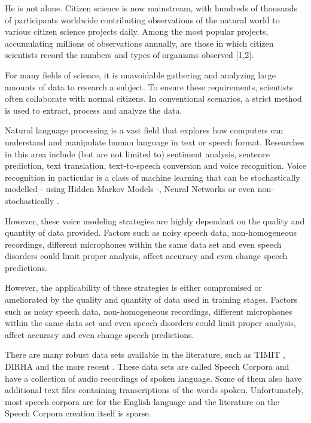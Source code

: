 He is not alone. Citizen science is now mainstream, with hundreds of thousands of participants worldwide contributing observations of the natural world to various citizen science projects daily. Among the most popular projects, accumulating millions of observations annually, are those in which citizen scientists record the numbers and types of organisms observed [1,2].

For many fields of science, it is unavoidable gathering and analyzing large amounts of data to research a subject. To ensure these requirements, scientists often collaborate with normal citizens. 
In conventional scenarios, a strict method is used to extract, process and analyze the data.

Natural language processing is a vast field that explores how computers can understand and manipulate human language in text or speech format. Researches in this area include (but are not limited to) sentiment analysis, sentence prediction, text translation, text-to-speech conversion and voice recognition. Voice recognition in particular is a class of machine learning that can be stochastically modelled - using Hidden Markov Models \cite{gales2008application} -, Neural Networks \cite{graves2013speech} or even non-stochastically \cite{burget2003nonrandomattr}.

However, these voice modeling strategies are highly dependant on the quality and quantity of data provided. Factors such as noisy speech data, non-homogeneous recordings, different microphones within the same data set and even speech disorders could limit proper analysis, affect accuracy and even change speech predictions. 

However, the applicability of these strategies is either compromised or ameliorated by the quality and quantity of data used in training stages. Factors such as noisy speech data, non-homogeneous recordings, different microphones within the same data set and even speech disorders could limit proper analysis, affect accuracy and even change speech predictions.

There are many robust data sets available in the literature, such as TIMIT \cite{Lamel1992timmit}, DIRHA \cite{Ravanelli2016dirha} and the more recent \cite{chanchaochai2018globaltimit}. These data sets are called Speech Corpora and have a collection of audio recordings of spoken language. Some of them also have additional text files containing transcriptions of the words spoken. Unfortunately, most speech corpora are for the English language \cite{LeRouxVincent2014TRdatasets} and the literature on the Speech Corpora creation itself is sparse.

